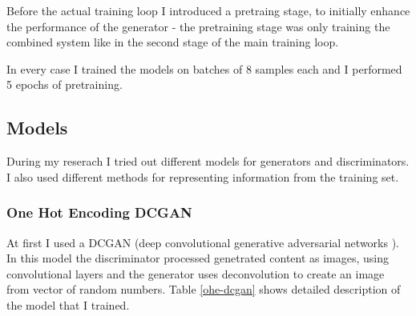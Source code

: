 \documentclass[]{article}
\begin{document}
Before the actual training loop I introduced a pretraing stage, to initially enhance the performance of the generator - the pretraining stage was only training the combined system like in the second stage of the main training loop.

In every case I trained the models on batches of 8 samples each and I performed 5 epochs of pretraining.

\subsection{Models}

During my reserach I tried out different models for generators and discriminators. I also used different methods for representing information from the training set. 

\subsubsection{One Hot Encoding DCGAN}

At first I used a DCGAN (deep convolutional generative adversarial networks \cite{dcgan}). In this model the discriminator processed genetrated content as images, using convolutional layers and the generator uses deconvolution to create an image from vector of random numbers. Table \ref{ohe-dcgan} shows detailed description of the model that I trained.
\end{document}
